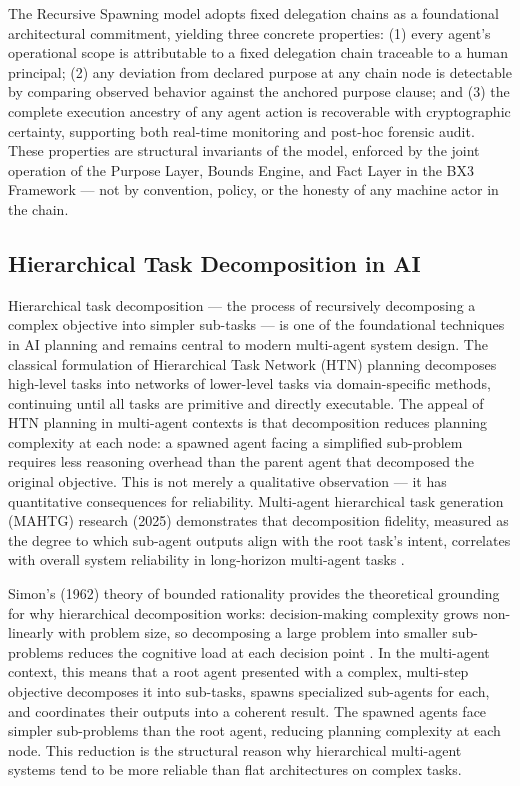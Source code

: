 {{The Recursive Spawning model adopts fixed delegation chains as a foundational architectural commitment, yielding three concrete properties: (1) every agent's operational scope is attributable to a fixed delegation chain traceable to a human principal; (2) any deviation from declared purpose at any chain node is detectable by comparing observed behavior against the anchored purpose clause; and (3) the complete execution ancestry of any agent action is recoverable with cryptographic certainty, supporting both real-time monitoring and post-hoc forensic audit. These properties are structural invariants of the model, enforced by the joint operation of the Purpose Layer, Bounds Engine, and Fact Layer in the BX3 Framework — not by convention, policy, or the honesty of any machine actor in the chain.

\subsection{Hierarchical Task Decomposition in AI}
\label{sec:htd}

Hierarchical task decomposition — the process of recursively decomposing a complex objective into simpler sub-tasks — is one of the foundational techniques in AI planning and remains central to modern multi-agent system design. The classical formulation of Hierarchical Task Network (HTN) planning \cite{ghallab2004htn,erpl} decomposes high-level tasks into networks of lower-level tasks via domain-specific methods, continuing until all tasks are primitive and directly executable. The appeal of HTN planning in multi-agent contexts is that decomposition reduces planning complexity at each node: a spawned agent facing a simplified sub-problem requires less reasoning overhead than the parent agent that decomposed the original objective. This is not merely a qualitative observation — it has quantitative consequences for reliability. Multi-agent hierarchical task generation (MAHTG) research (2025) demonstrates that decomposition fidelity, measured as the degree to which sub-agent outputs align with the root task's intent, correlates with overall system reliability in long-horizon multi-agent tasks \cite{mahtg2025}.

Simon's (1962) theory of bounded rationality provides the theoretical grounding for why hierarchical decomposition works: decision-making complexity grows non-linearly with problem size, so decomposing a large problem into smaller sub-problems reduces the cognitive load at each decision point \cite{simon}. In the multi-agent context, this means that a root agent presented with a complex, multi-step objective decomposes it into sub-tasks, spawns specialized sub-agents for each, and coordinates their outputs into a coherent result. The spawned agents face simpler sub-problems than the root agent, reducing planning complexity at each node. This reduction is the structural reason why hierarchical multi-agent systems tend to be more reliable than flat architectures on complex tasks.

}}
